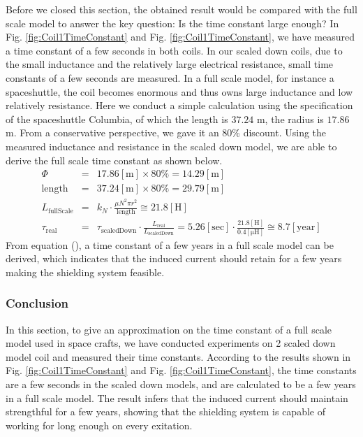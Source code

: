 Before we closed this section, the obtained result would be compared with the full scale model to answer the key question:
Is the time constant large enough?
In Fig. \ref{fig:Coil1TimeConstant} and Fig. \ref{fig:Coil1TimeConstant}, we have measured a time constant of a few seconds in both coils.
In our scaled down coils, due to the small inductance and the relatively large electrical resistance,
small time constants of a few seconds are measured.
In a full scale model, for instance a spaceshuttle, the coil becomes enormous and thus owns large inductance and low relatively resistance.
Here we conduct a simple calculation using the specification of the spaceshuttle Columbia,
of which the length is $37.24$ m, the radius is $17.86$ m.
From a conservative perspective, we gave it an 80\% discount.
Using the measured inductance and resistance in the scaled down model,
we are able to derive the full scale time constant as shown below.
\begin{eqnarray}
  \Phi &=& 17.86[\mathrm{m}] \times 80\% = 14.29[\mathrm{m}] \\\nonumber
  \mathrm{length} &=& 37.24[\mathrm{m}] \times 80\% = 29.79[\mathrm{m}] \\\nonumber
  L_{\mathrm{fullScale}} &=& k_N\cdot\frac{\mu N^2\pi r^2}{\mathrm{length}}\cong21.8 [\mathrm{H}] \\\nonumber
  \tau_{\mathrm{real}} &=& \tau_{\mathrm{scaledDown}}\cdot\frac{L_{\mathrm{real}}}{L_\mathrm{scaledDown}} = 5.26[\mathrm{sec}]\cdot\frac{21.8[\mathrm{H}]}{0.4[\mathrm{\mu H}]}\cong 8.7[\mathrm{year}]
\end{eqnarray}
From equation (), a time constant of a few years in a full scale model can be derived,
which indicates that the induced current should retain for a few years making the shielding system feasible.

\subsubsection{Conclusion}
In this section, to give an approximation on the time constant of a full scale model used in space crafts,
we have conducted experiments on 2 scaled down model coil and measured their time constants.
According to the results shown in Fig. \ref{fig:Coil1TimeConstant} and Fig. \ref{fig:Coil1TimeConstant},
the time constants are a few seconds in the scaled down models,
and are calculated to be a few years in a full scale model.
The result infers that the induced current should maintain strengthful for a few years,
showing that the shielding system is capable of working for long enough on every exitation.


